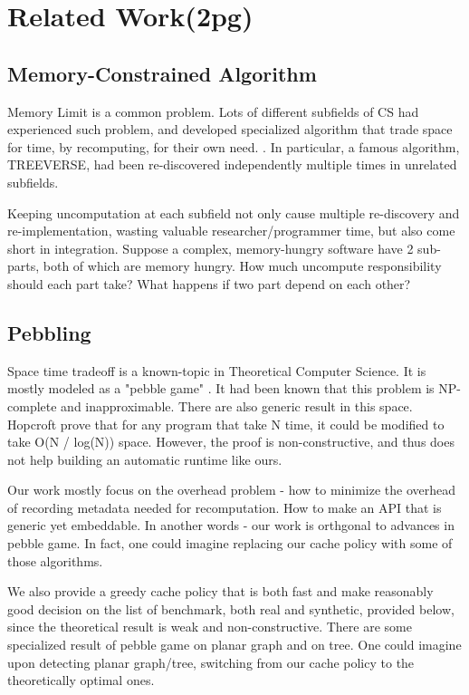\section{Related Work(2pg)}
\subsection{Memory-Constrained Algorithm}
Memory Limit is a common problem. Lots of different subfields of CS had experienced such problem, and developed specialized algorithm that trade space for time, by recomputing, for their own need. . In particular, a famous algorithm, TREEVERSE, had been re-discovered independently multiple times in unrelated subfields.

Keeping uncomputation at each subfield not only cause multiple re-discovery and re-implementation, wasting valuable researcher/programmer time, but also come short in integration. Suppose a complex, memory-hungry software have 2 sub-parts, both of which are memory hungry. How much uncompute responsibility should each part take? What happens if two part depend on each other?
\subsection{Pebbling}
Space time tradeoff is a known-topic in Theoretical Computer Science. It is mostly modeled as a "pebble game" . It had been known that this problem is NP-complete and inapproximable. There are also generic result in this space. Hopcroft prove that for any program that take N time, it could be modified to take O(N / log(N)) space. However, the proof is non-constructive, and thus does not help building an automatic runtime like ours.

Our work mostly focus on the overhead problem - how to minimize the overhead of recording metadata needed for recomputation. How to make an API that is generic yet embeddable. In another words - our work is orthgonal to advances in pebble game. In fact, one could imagine replacing our cache policy with some of those algorithms.

We also provide a greedy cache policy that is both fast and make reasonably good decision on the list of benchmark, both real and synthetic, provided below, since the theoretical result is weak and non-constructive. There are some specialized result of pebble game on planar graph and on tree. One could imagine upon detecting planar graph/tree, switching from our cache policy to the theoretically optimal ones.
